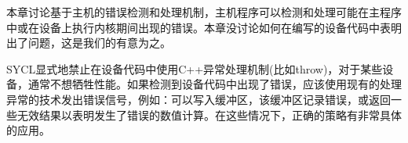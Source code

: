 本章讨论基于主机的错误检测和处理机制，主机程序可以检测和处理可能在主程序中或在设备上执行内核期间出现的错误。本章没讨论如何在编写的设备代码中表明出了问题，这是我们的有意为之。\par

SYCL显式地禁止在设备代码中使用C++异常处理机制(比如throw)，对于某些设备，通常不想牺牲性能。如果检测到设备代码中出现了错误，应该使用现有的处理异常的技术发出错误信号，例如：可以写入缓冲区，该缓冲区记录错误，或返回一些无效结果以表明发生了错误的数值计算。在这些情况下，正确的策略有非常具体的应用。\par